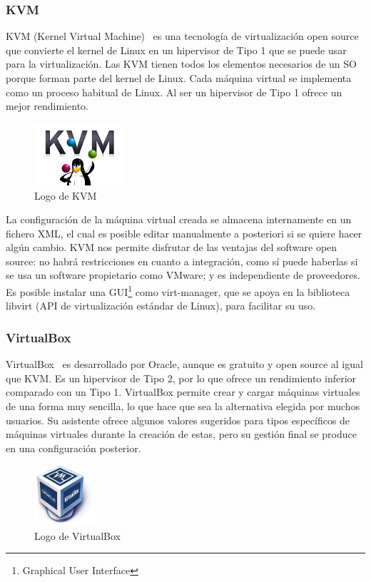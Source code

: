 \subsubsection{KVM}
KVM (Kernel Virtual Machine)~\cite{kvm} es una tecnología de virtualización open source que convierte el kernel de Linux en un hipervisor de Tipo 1 que se puede usar para la virtualización. Las KVM tienen todos los elementos necesarios de un SO porque forman parte del kernel de Linux. Cada máquina virtual se implementa como un proceso habitual de Linux. Al ser un hipervisor de Tipo 1 ofrece un mejor rendimiento. 

\begin{figure}[h]
\centering
\includegraphics[width=0.3\textwidth]{../imgs/EdA/kvm.png}
\caption{Logo de KVM}
\label{fig:kvm}
\end{figure}

La configuración de la máquina virtual creada se almacena internamente en un fichero XML, el cual es posible editar manualmente a posteriori si se quiere hacer algún cambio. KVM nos permite disfrutar de las ventajas del software open source: no habrá restricciones en cuanto a integración, como sí puede haberlas si se usa un software propietario como VMware; y es independiente de proveedores. Es posible instalar una GUI\footnote{Graphical User Interface} como virt-manager, que se apoya en la biblioteca libvirt (API de virtualización estándar de Linux), para facilitar su uso.

\subsubsection{VirtualBox}
VirtualBox~\cite{vbox} es desarrollado por Oracle, aunque es gratuito y open source al igual que KVM. Es un hipervisor de Tipo 2, por lo que ofrece un rendimiento inferior comparado con un Tipo 1. VirtualBox permite crear y cargar máquinas virtuales de una forma muy sencilla, lo que hace que sea la alternativa elegida por muchos usuarios. Su asistente ofrece algunos valores sugeridos para tipos específicos de máquinas virtuales durante la creación de estas, pero su gestión final se produce en una configuración posterior.

\begin{figure}[h]
\centering
\includegraphics[width=0.2\textwidth]{../imgs/EdA/vbox.png}
\caption{Logo de VirtualBox}
\label{fig:vbox}
\end{figure}


